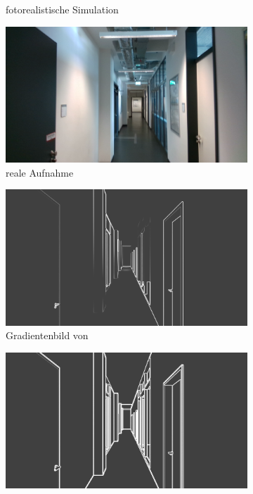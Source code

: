 \begin{figure}[H]
\begin{subfigure}[t]{0.24\linewidth}
		\caption{fotorealistische \hspace{1cm} Simulation}
		\label{subfig:photorealistic}
	\end{subfigure}
	\hfill 
	\begin{subfigure}[t]{0.24\linewidth}
		\centering
		\includegraphics[width=\linewidth]{images/syn_dataset/r000305.png}
		\caption{reale Aufnahme \hspace{2cm}}
		\label{subfig:real}
	\end{subfigure}
	\hfill 
	\begin{subfigure}[t]{0.24\linewidth}
		\centering
		\includegraphics[width=\linewidth]{images/syn_dataset/bg00708.png}
		\caption{Gradientenbild  \hspace{1cm} von }
	\end{subfigure}
	\hfill
	\begin{subfigure}[t]{0.24\linewidth}
		\centering
		\includegraphics[width=\linewidth]{images/syn_dataset/eg00708.png}

\end{subfigure}
\end{figure}
